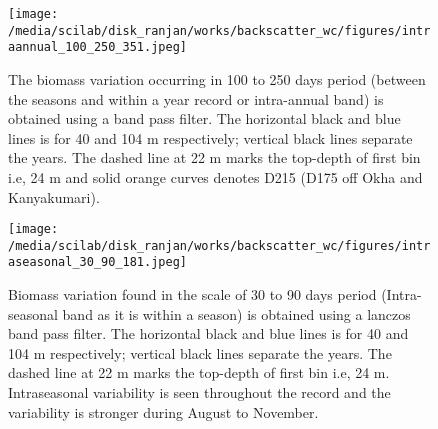 \documentclass{article}
\begin{document}
\begin{figure}[htbp]
	\centering
	\texttt{[image: /media/scilab/disk\_ranjan/works/backscatter\_wc/figures/intraannual\_100\_250\_351.jpeg]} 
	\captionsetup{justification=justified,font=footnotesize,skip=0.05\baselineskip,width=\textwidth}
	\caption{The biomass variation occurring in 100 to 250 days period (between the seasons and within a year record or intra-annual band) is obtained using a band pass filter. The horizontal black and blue lines is for 40 and 104 m respectively; vertical black lines separate the years. The dashed line at 22 m marks the top-depth of first bin i.e, 24 m and solid orange curves denotes D215 (D175 off Okha and Kanyakumari). }
	\label{fig:intraannual}
\end{figure}

\begin{figure}[htbp]
	\centering
	\texttt{[image: /media/scilab/disk\_ranjan/works/backscatter\_wc/figures/intraseasonal\_30\_90\_181.jpeg]} 
	\captionsetup{justification=justified,font=footnotesize,skip=0.05\baselineskip,width=\textwidth}
	\caption{Biomass variation found in the scale of 30 to 90 days  period (Intra-seasonal band as it is within a season) is obtained using a lanczos band pass filter. The horizontal black and blue lines is for 40 and 104 m respectively; vertical black lines separate the years. The dashed line at 22 m marks the top-depth of first bin i.e, 24 m.  Intraseasonal variability is seen throughout the record and the variability is stronger during August to November.}
	\label{fig:intraseasonal}
\end{figure}
\end{document}
